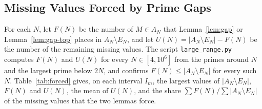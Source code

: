 \documentclass[11pt]{amsart}
\theoremstyle{definition}
\theoremstyle{remark}
\begin{document}
\subsection{Missing Values Forced by Prime Gaps}\label{subsec:forced-data}
For each $N$, let $F(N)$ be the number of $M\in A_N$ that Lemma~\ref{lem:gap} or Lemma~\ref{lem:gap-top} places in $A_N\setminus E_N$, and let $U(N)=|A_N\setminus E_N|-F(N)$ be the number of the remaining missing values. The script \texttt{large\_range.py} computes $F(N)$ and $U(N)$ for every $N\in[4,10^6]$ from the primes around $N$ and the largest prime below $2N$, and confirms $F(N)\leq |A_N\setminus E_N|$ for every such $N$. Table~\ref{tab:forced} gives, on each interval $I_m$, the largest values of $|A_N\setminus E_N|$, $F(N)$ and $U(N)$, the mean of $U(N)$, and the share $\sum F(N)/\sum|A_N\setminus E_N|$ of the missing values that the two lemmas force.
\end{document}
